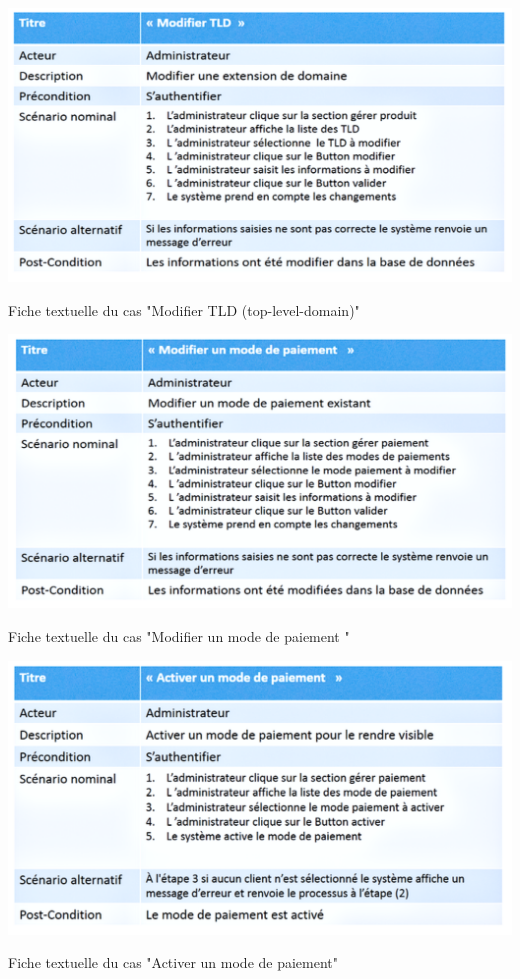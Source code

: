 \documentclass[a4paper, 12pt]{report}
\begin{document}
\begin{table}[H]
	\centering
	\includegraphics{img/fiche/15}
	\caption{Fiche textuelle du cas "Modifier TLD (top-level-domain)"}
	\label{Tux}
\end{table}
\begin{table}[H]
	\centering
	\includegraphics{img/fiche/16}
	\caption{Fiche textuelle du cas "Modifier un mode de paiement "}
	\label{Tux}
\end{table}
\begin{table}[H]
	\centering
	\includegraphics{img/fiche/17}
	\caption{Fiche textuelle du cas "Activer un mode de paiement"}
	\label{Tux}
\end{table}
\end{document}

